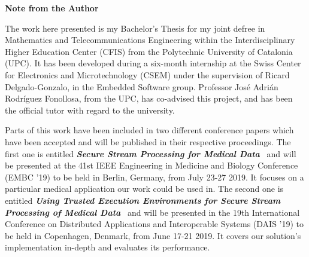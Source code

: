 \vspace*{4cm}
\Huge
\textbf{Note from the Author} \label{sec:acknowledgments}
\normalsize

\vspace{1cm}

The work here presented is my Bachelor's Thesis for my joint defree in Mathematics and Telecommunications Engineering within the Interdisciplinary Higher Education Center (CFIS) from the Polytechnic University of Catalonia (UPC).
It has been developed during a six-month internship at the Swiss Center for Electronics and Microtechnology (CSEM) under the supervision of Ricard Delgado-Gonzalo, in the Embedded Software group.
Professor Jos\'e Adri\'an Rodr\'iguez Fonollosa, from the UPC, has co-advised this project, and has been the official tutor with regard to the university.

Parts of this work have been included in two different conference papers which have been accepted and will be published in their respective proceedings.
The first one is entitled \textbf{\textit{Secure Stream Processing for Medical Data}}~\cite{Segarra2019} and will be presented at the 41st IEEE Engineering in Medicine and Biology Conference (EMBC '19) to be held in Berlin, Germany, from July 23-27 2019.
It focuses on a particular medical application our work could be used in.
The second one is entitled \textbf{\textit{Using Trusted Execution Environments for Secure Stream Processing of Medical Data}}~\cite{Segarra2019b} and will be presented in the 19th International Conference on Distributed Applications and Interoperable Systems (DAIS '19) to be held in Copenhagen, Denmark, from June 17-21 2019.
It covers our solution's implementation in-depth and evaluates its performance.

%
%

\vspace*{\fill}
